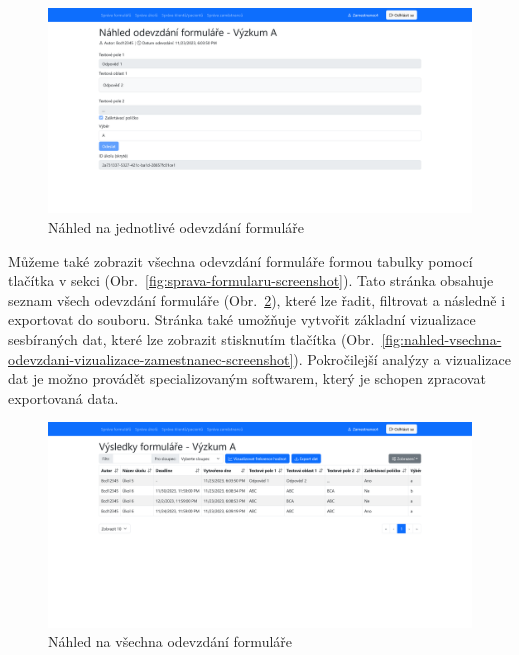 \begin{figure}[H]
    \includegraphics[width=\textwidth]{../img/screenshots/nahled-odevzdani-zamestnanec}
    \caption{Náhled na jednotlivé odevzdání formuláře}\label{fig:nahled-odevzdani-zamestnanec-screenshot}
\end{figure}

Můžeme také zobrazit všechna odevzdání formuláře formou tabulky pomocí tlačítka  v sekci  (Obr.~\ref{fig:sprava-formularu-screenshot}).
Tato stránka obsahuje seznam všech odevzdání formuláře (Obr.~\ref{fig:nahled-vsechna-odevzdani-zamestnanec-screenshot}), které lze řadit, filtrovat a následně i exportovat do souboru.
Stránka také umožňuje vytvořit základní vizualizace sesbíraných dat, které lze zobrazit stisknutím tlačítka  (Obr.~\ref{fig:nahled-vsechna-odevzdani-vizualizace-zamestnanec-screenshot}).
Pokročilejší analýzy a vizualizace dat je možno provádět specializovaným softwarem, který je schopen zpracovat exportovaná data.

\begin{figure}[H]
    \includegraphics[width=\textwidth]{../img/screenshots/vysledky-formulare}
    \caption{Náhled na všechna odevzdání formuláře}\label{fig:nahled-vsechna-odevzdani-zamestnanec-screenshot}
\end{figure}

